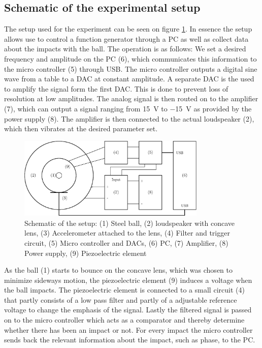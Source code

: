 \documentclass[12pt,oneside,a4paper]{article}
\numberwithin{equation}{section}
\begin{document}
{{{{\subsection{Schematic of the experimental setup}
The setup used for the experiment can be seen on figure \ref{setupdia}. In essence the setup allows use to control a function generator through a PC as well as collect data about the impacts with the ball. The operation is as follows: We set a desired frequency and amplitude on the PC (6), which communicates this information to the micro controller (5) through USB. The micro controller outputs a digital sine wave from a table to a DAC at constant amplitude. A separate DAC is the used to amplify the signal form the first DAC. This is done to prevent loss of resolution at low amplitudes. The analog signal is then routed on to the amplifier (7), which can output a signal ranging from \SI{+15}{V} to \SI{-15}{V} as provided by the power supply (8). The amplifier is then connected to the actual loudspeaker (2), which then vibrates at the desired parameter set.
\begin{figure}[h]
	\centering
	\includegraphics[width=0.8\textwidth]{setup}
	\caption{Schematic of the setup: (1) Steel ball, (2) loudspeaker with concave lens, (3) Accelerometer attached to the lens, (4) Filter and trigger circuit, (5) Micro controller and DACs, (6) PC, (7) Amplifier, (8) Power supply, (9) Piezoelectric element}
	\label{setupdia}
\end{figure}
As the ball (1) starts to bounce on the concave lens, which was chosen to minimize sideways motion, the piezoelectric element (9) induces a voltage when the ball impacts. The piezoelectric element is connected to a small circuit (4) that partly consists of a low pass filter and partly of a adjustable reference voltage to change the emphasis of the signal. Lastly the filtered signal is passed on to the micro controller which acts as a comparator and thereby determine whether there has been an impact or not. For every impact the micro controller sends back the relevant information about the impact, such as phase, to the PC.

}}}}
\end{document}
